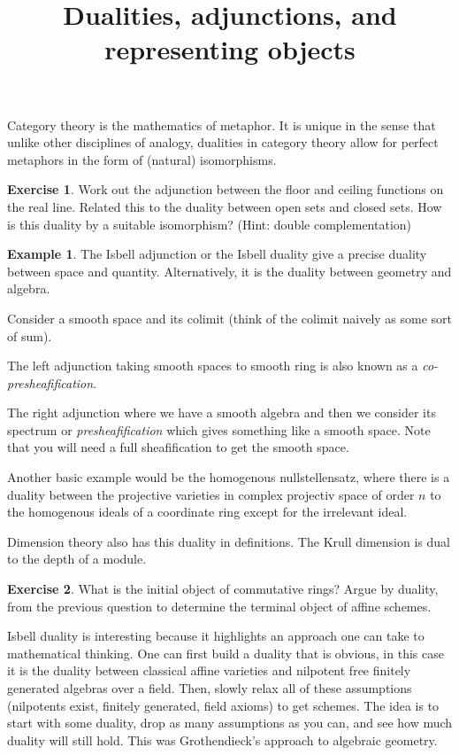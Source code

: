 \documentclass[10pt]{article}
\theoremstyle{plain}%
\theoremstyle{definition}
\newtheorem{example}{Example}[section]
\newtheorem{exercise}{Exercise}[section]
\theoremstyle{remark}
\begin{document}
\title{Dualities, adjunctions, and representing objects}

\maketitle

Category theory is the mathematics of metaphor. It is unique in the sense that unlike other disciplines of analogy, dualities in category theory allow for perfect metaphors in the form of (natural) isomorphisms.

\begin{exercise}
	Work out the adjunction between the floor and ceiling functions on the real line. Related this to the duality between open sets and closed sets. How is this duality by a suitable isomorphism? (Hint: double complementation)
\end{exercise}

\begin{example}
	The Isbell adjunction or the Isbell duality give a precise duality between space and quantity. Alternatively, it is the duality between geometry and algebra.

	Consider a smooth space and its colimit (think of the colimit naively as some sort of sum). 
	
	The left adjunction taking smooth spaces to smooth ring is also known as a \textit{co-presheafification}. 
	
	The right adjunction where we have a smooth algebra and then we consider its spectrum or \textit{presheafification} which gives something like a smooth space. Note that you will need a full sheafification to get the smooth space.

	Another basic example would be the homogenous nullstellensatz, where there is a duality between the projective varieties in complex projectiv space of order $n$ to the homogenous ideals of a coordinate ring except for the irrelevant ideal.

	Dimension theory also has this duality in definitions. The Krull dimension is dual to the depth of a module.
\end{example}

\begin{exercise}
	What is the initial object of commutative rings?
	Argue by duality, from the previous question to determine the terminal object of affine schemes.
\end{exercise}

Isbell duality is interesting because it highlights an approach one can take to mathematical thinking. One can first build a duality that is obvious, in this case it is the duality between classical affine varieties and nilpotent free finitely generated algebras over a field. Then, slowly relax all of these assumptions (nilpotents exist, finitely generated, field axioms) to get schemes. The idea is to start with some duality, drop as many assumptions as you can, and see how much duality will still hold. This was Grothendieck's approach to algebraic geometry.
\end{document}
